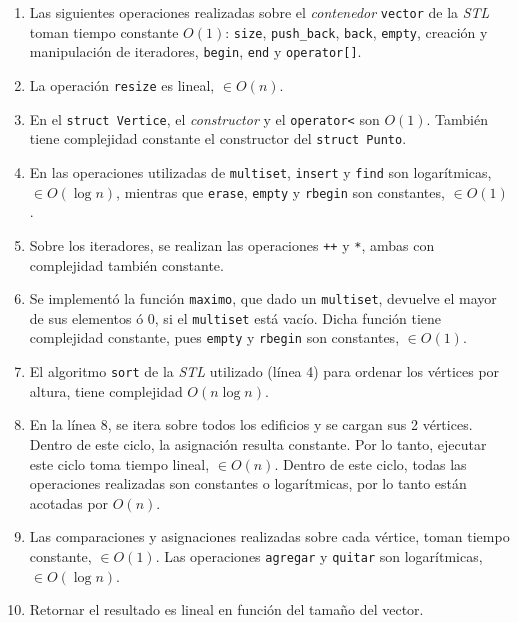 \begin{enumerate}
   \item Las siguientes operaciones realizadas sobre el \textit{contenedor} \verb|vector| de la \textit{STL} toman tiempo constante $O(1)$:
   \verb|size|, \verb|push_back|, \verb|back|, \verb|empty|, creación y manipulación de iteradores, \verb|begin|, \verb|end|
   y \verb|operator[]|.

   \item La operación \verb|resize| es lineal, $\in O(n)$.

   \item En el \verb|struct Vertice|, el \textit{constructor} y el \verb|operator<| son $O(1)$. También
   tiene complejidad constante el constructor del \verb|struct Punto|.

   \item En las operaciones utilizadas de \verb|multiset|, \verb|insert| y \verb|find| son logarítmicas,
   $\in O(\log n)$, mientras que \verb|erase|, \verb|empty| y \verb|rbegin| son constantes, $\in O(1)$.

   \item Sobre los iteradores, se realizan las operaciones \verb|++| y \verb|*|, ambas
   con complejidad también constante.

   \item Se implementó la función \verb|maximo|, que dado un \verb|multiset|, devuelve
   el mayor de sus elementos ó 0, si el \verb|multiset| está vacío. Dicha función
   tiene complejidad constante, pues \verb|empty| y \verb|rbegin| son constantes, $\in O(1)$.

   \item El algoritmo \verb|sort| de la \textit{STL} utilizado (línea 4) para ordenar los vértices
   por altura, tiene complejidad $O(n \log n)$.

   \item En la línea 8, se itera sobre todos los edificios y se cargan sus 2 vértices. Dentro
   de este ciclo, la asignación resulta constante. Por lo tanto, ejecutar este ciclo
   toma tiempo lineal, $\in O(n)$. Dentro de este ciclo, todas las operaciones realizadas son
   constantes o logarítmicas, por lo tanto están acotadas por $O(n)$.

   \item Las comparaciones y asignaciones realizadas sobre cada vértice, toman tiempo constante,  $\in O(1)$.
   Las operaciones \verb|agregar| y \verb|quitar| son logarítmicas, $\in O(\log n)$.

   \item Retornar el resultado es lineal en función del tamaño del vector.
 \end{enumerate}


